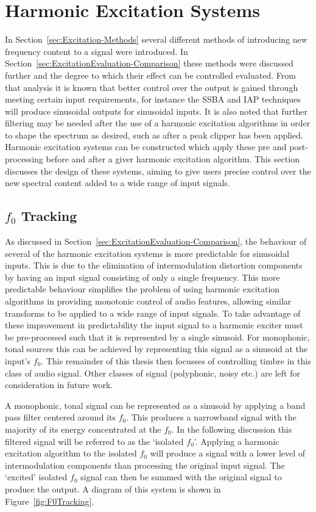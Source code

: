 \section{Harmonic Excitation Systems}
\label{sec:FeatureControl-Systems}
	In Section~\ref{sec:Excitation-Methods} several different methods of introducing new frequency content to a signal
	were introduced. In Section~\ref{sec:ExcitationEvaluation-Comparison} these methods were discussed further and the
	degree to which their effect can be controlled evaluated. From that analysis it is known that better control over
	the output is gained through meeting certain input requirements, for instance the SSBA and IAP techniques will
	produce sinusoidal outputs for sinusoidal inputs. It is also noted that further filtering may be needed after the
	use of a harmonic excitation algorithms in order to shape the spectrum as desired, such as after a peak clipper has
	been applied. Harmonic excitation systems can be constructed which apply these pre and post-processing before and
	after a giver harmonic excitation algorithm. This section discusses the design of these systems, aiming to give
	users precise control over the new spectral content added to a wide range of input signals.

	\subsection{$f_{0}$ Tracking}
	\label{sec:FeatureControl-Systems-Fundamental}
		As discussed in Section~\ref{sec:ExcitationEvaluation-Comparison}, the behaviour of several of the harmonic
		excitation systems is more predictable for sinusoidal inputs. This is due to the elimination of
		intermodulation distortion components by having an input signal consisting of only a single frequency. This
		more predictable behaviour simplifies the problem of using harmonic excitation algorithms in providing
		monotonic control of audio features, allowing similar transforms to be applied to a wide range of input
		signals. To take advantage of these improvement in predictability the input signal to a harmonic exciter
		must be pre-processed such that it is represented by a single sinusoid. For monophonic, tonal sources this
		can be achieved by representing this signal as a sinusoid at the input's $f_{0}$. This remainder of this
		thesis then focusses of controlling timbre in this class of audio signal. Other classes of signal
		(polyphonic, noisy etc.) are left for consideration in future work.
		
		A monophonic, tonal signal can be represented as a sinusoid by applying a band pass filter centered around
		its $f_{0}$. This produces a narrowband signal with the majority of its energy concentrated at the $f_{0}$.
		In the following discussion this filtered signal will be referred to as the `isolated $f_{0}$'. Applying a
		harmonic excitation algorithm to the isolated $f_{0}$ will produce a signal with a lower level of
		intermodulation components than processing the original input signal. The `excited' isolated $f_{0}$ signal
		can then be summed with the original signal to produce the output. A diagram of this system is shown in
		Figure~\ref{fig:F0Tracking}.

